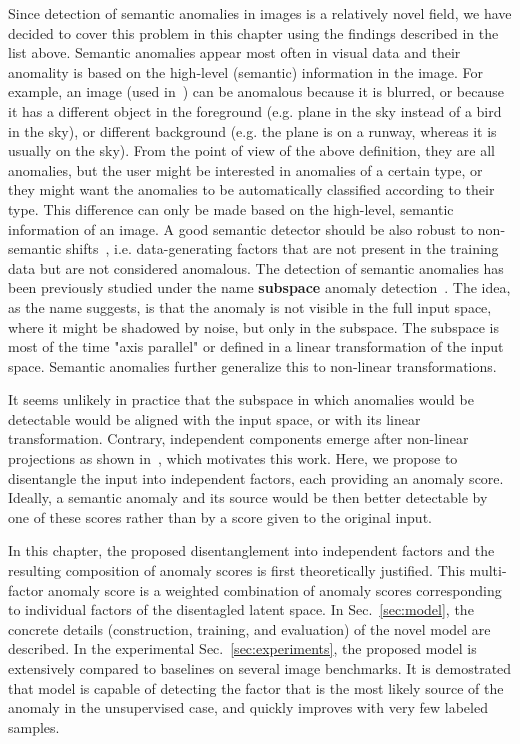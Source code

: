 Since detection of semantic anomalies in images is a relatively novel field, we have decided to cover this problem in this chapter using the findings described in the list above. Semantic anomalies appear most often in visual data and their anomality is based on the high-level (semantic) information in the image. For example, an image (used in~\cite{vskvara2021comparison}) can be anomalous because it is blurred, or because it has a different object in the foreground (e.g. plane in the sky instead of a bird in the sky), or different background (e.g. the plane is on a runway, whereas it is usually on the sky). From the point of view of the above definition, they are all anomalies, but the user might be interested in anomalies of a certain type, or they might want the anomalies to be automatically classified according to their type. This difference can only be made based on the high-level, semantic information of an image. A good semantic detector should be also robust to non-semantic shifts~\cite{ahmed2021systematic}, i.e. data-generating factors that are not present in the training data but are not considered anomalous. The detection of semantic anomalies has been previously studied under the name \textbf{subspace} anomaly detection~\cite{raz2002semantic, kriegel2009outlier,rahmani2016randomized}. The idea, as the name suggests, is that the anomaly is not visible in the full input space, where it might be shadowed by noise, but only in the subspace. The subspace is most of the time "axis parallel" or defined in a linear transformation of the input space. Semantic anomalies further generalize this to non-linear transformations.

It seems unlikely in practice that the subspace in which anomalies would be detectable would be aligned with the input space, or with its linear transformation. Contrary, independent components emerge after non-linear projections as shown in~\cite{burgess2018understanding, kim2018disentangling, esmaeili2019structuredhfvae, tschannen2018recent, bai2021contrastively, kim2019bayes, deecke2021transfer}, which motivates this work. Here, we propose to disentangle the input into independent factors, each providing an anomaly score. Ideally, a semantic anomaly and its source would be then better detectable by one of these scores rather than by a score given to the original input. 

In this chapter, the proposed disentanglement into independent factors and the resulting composition of anomaly scores is first theoretically justified. This multi-factor anomaly score is a weighted combination of anomaly scores corresponding to individual factors of the disentagled latent space. In Sec.~\ref{sec:model}, the concrete details (construction, training, and evaluation) of the novel model are described. In the experimental Sec.~\ref{sec:experiments}, the proposed model is extensively compared to baselines on several image benchmarks. It is demostrated that model is capable of detecting the factor that is the most likely source of the anomaly in the unsupervised case, and quickly improves with very few labeled samples.

